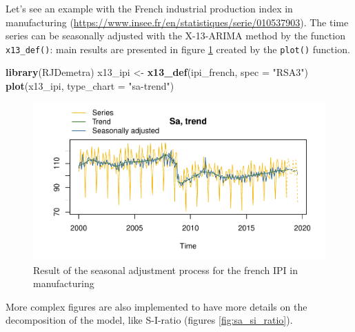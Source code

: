 \documentclass[12pt,a4paper]{article}
\newenvironment{Shaded}{\begin{snugshade}}{\end{snugshade}}
\newcommand{\KeywordTok}[1]{\textcolor[rgb]{0.13,0.29,0.53}{\textbf{#1}}}
\newcommand{\DataTypeTok}[1]{\textcolor[rgb]{0.13,0.29,0.53}{#1}}
\newcommand{\StringTok}[1]{\textcolor[rgb]{0.31,0.60,0.02}{#1}}
\newcommand{\OtherTok}[1]{\textcolor[rgb]{0.56,0.35,0.01}{#1}}
\newcommand{\OperatorTok}[1]{\textcolor[rgb]{0.81,0.36,0.00}{\textbf{#1}}}
\newcommand{\NormalTok}[1]{#1}
\begin{document}
Let's see an example with the French industrial production index in
manufacturing
(\url{https://www.insee.fr/en/statistiques/serie/010537903}). The time
series can be seasonally adjusted with the X-13-ARIMA method by the
function \texttt{x13\_def()}: main results are presented in figure
\ref{fig:sa_ipi} created by the \texttt{plot()} function.

\begin{Shaded}
\begin{Highlighting}[]
\KeywordTok{library}\NormalTok{(RJDemetra)}
\NormalTok{x13_ipi <-}\StringTok{ }\KeywordTok{x13_def}\NormalTok{(ipi_french, }\DataTypeTok{spec =} \StringTok{"RSA3"}\NormalTok{)}
\KeywordTok{plot}\NormalTok{(x13_ipi, }\DataTypeTok{type_chart =} \StringTok{"sa-trend"}\NormalTok{)}
\end{Highlighting}
\end{Shaded}

\begin{figure}[H]
\centering
\includegraphics{NTTS_files/figure-latex/unnamed-chunk-2-1.pdf}
\caption{\label{fig:sa_ipi}Result of the seasonal adjustment process
for the french IPI in manufacturing}
\end{figure}

More complex figures are also implemented to have more details on the
decomposition of the model, like S-I-ratio (figures
\ref{fig:sa_si_ratio}).

\begin{Shaded}
\end{Shaded}%
\end{document}

